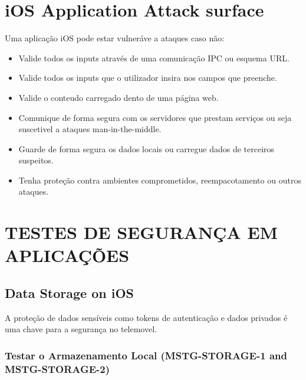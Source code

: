 \section{iOS Application Attack surface}
\hfill\par

Uma aplicação iOS pode estar vulneráve a ataques caso não:

\renewcommand\labelitemi{.}
\begin{itemize}

\item Valide todos os inputs através de uma comunicação IPC ou esquema URL.

\item Valide todos os inputs que o utilizador insira nos campos que preenche.

\item Valide o conteudo carregado dento de uma página web.

\item Comunique de forma segura com os servidores que prestam serviços ou seja suscetivel a ataques man-in-the-middle.

\item Guarde de forma segura os dados locais ou carregue dados de terceiros suspeitos.

\item Tenha proteção contra ambientes comprometidos, reempacotamento ou outros ataques\cite{ref_intro3}. 


\end{itemize}

\section{TESTES DE SEGURANÇA EM APLICAÇÕES}
\hfill\par

\subsection{Data Storage on iOS}
\hfill\par
A proteção de dados sensíveis como tokens de autenticação e dados privados é uma chave para a segurança no telemovel.


\subsubsection{Testar o Armazenamento Local (MSTG-STORAGE-1 and MSTG-STORAGE-2)}
\hfill\par
\hfill\par


